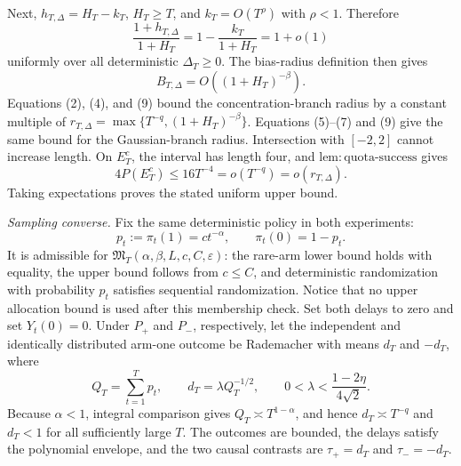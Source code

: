 Next, \(h_{T,\Delta}=H_T-k_T\), \(H_T\geq T\), and \(k_T=O(T^\rho)\) with \(\rho<1\).  Therefore
\[
 \frac{1+h_{T,\Delta}}{1+H_T}
 =1-\frac{k_T}{1+H_T}=1+o(1) \tag{8}
\]
uniformly over all deterministic \(\Delta_T\geq0\).  The bias-radius definition then gives
\[
 B_{T,\Delta}=O\!\left((1+H_T)^{-\beta}\right). \tag{9}
\]
Equations (2), (4), and (9) bound the concentration-branch radius by a constant multiple of
\(
r_{T,\Delta}=\max\{T^{-q},(1+H_T)^{-\beta}\}
\).
Equations (5)--(7) and (9) give the same bound for the Gaussian-branch radius.  Intersection with \([-2,2]\) cannot increase length.  On \(E_T^c\), the interval has length four, and \(\mathrm{lem:quota\text{-}success}\) gives
\[
 4P(E_T^c)\leq16T^{-4}=o(T^{-q})=o(r_{T,\Delta}). \tag{10}
\]
Taking expectations proves the stated uniform upper bound.

\emph{Sampling converse.}
Fix the same deterministic policy in both experiments:
\[
 p_t:=\pi_t(1)=ct^{-\alpha},
 \qquad \pi_t(0)=1-p_t. \tag{11}
\]
It is admissible for \(\mathfrak M_T(\alpha,\beta,L,c,C,\varepsilon)\): the rare-arm lower bound holds with equality, the upper bound follows from \(c\leq C\), and deterministic randomization with probability \(p_t\) satisfies sequential randomization.  Notice that no upper allocation bound is used after this membership check.  Set both delays to zero and set \(Y_t(0)=0\).  Under \(P_+\) and \(P_-\), respectively, let the independent and identically distributed arm-one outcome be Rademacher with means \(d_T\) and \(-d_T\), where
\[
 Q_T=\sum_{t=1}^T p_t,
 \qquad d_T=\lambda Q_T^{-1/2},
 \qquad 0<\lambda<\frac{1-2\eta}{4\sqrt2}. \tag{12}
\]
Because \(\alpha<1\), integral comparison gives \(Q_T\asymp T^{1-\alpha}\), and hence \(d_T\asymp T^{-q}\) and \(d_T<1\) for all sufficiently large \(T\).  The outcomes are bounded, the delays satisfy the polynomial envelope, and the two causal contrasts are
\(
\tau_+=d_T
\)
and
\(
\tau_-=-d_T
\).

